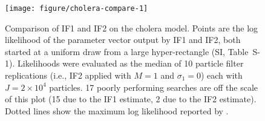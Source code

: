 \documentclass{pnastwo}\usepackage[]{graphicx}\usepackage[]{color}
\newenvironment{knitrout}{}{} %
\newcommand\IF{IF2}
\begin{document}
\begin{figure}
\begin{center}
\begin{knitrout}\scriptsize
{}\color{fgcolor}

\texttt{[image: figure/cholera-compare-1]} \hfill{}



\end{knitrout}
\end{center}
\caption{Comparison of IF1 and IF2 on the cholera model. Points are the log likelihood of the parameter vector output by IF1 and IF2, both started at a uniform draw from a large hyper-rectangle (SI, Table~S-1). Likelihoods were evaluated as the median of 10 particle filter replications (i.e.,  {\IF} applied with $M=1$ and $\sigma_1=0$) each with $J=2\times 10^4$ particles.
 17 poorly performing searches are off the scale of this plot (15 due to the IF1 estimate, 2 due to the IF2 estimate). Dotted lines show the maximum log likelihood reported by \cite{king08}.}
\label{fig:chol-compare}
\end{figure}
\end{document}
